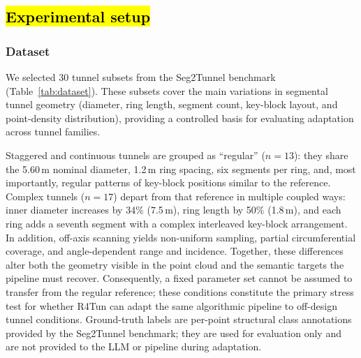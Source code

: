 \documentclass[a4paper,fleqn]{cas-dc}
\begin{document}
{\subsection{\hl{Experimental setup}}\label{sec:exp-setup}

\subsubsection{Dataset}\label{sec:dataset}

We selected 30 tunnel subsets from the Seg2Tunnel benchmark (Table~\ref{tab:dataset}). These subsets cover the main variations in segmental tunnel geometry (diameter, ring length, segment count, key-block layout, and point-density distribution), providing a controlled basis for evaluating adaptation across tunnel families.

Staggered and continuous tunnels are grouped as ``regular'' ($n = 13$): they share the 5.60\,m nominal diameter, 1.2\,m ring spacing, six segments per ring, and, most importantly, regular patterns of key-block positions similar to the reference. Complex tunnels ($n = 17$) depart from that reference in multiple coupled ways: inner diameter increases by 34\% (7.5\,m), ring length by 50\% (1.8\,m), and each ring adds a seventh segment with a complex interleaved key-block arrangement. In addition, off-axis scanning yields non-uniform sampling, partial circumferential coverage, and angle-dependent range and incidence. Together, these differences alter both the geometry visible in the point cloud and the semantic targets the pipeline must recover. Consequently, a fixed parameter set cannot be assumed to transfer from the regular reference; these conditions constitute the primary stress test for whether R4Tun can adapt the same algorithmic pipeline to off-design tunnel conditions. Ground-truth labels are per-point structural class annotations provided by the Seg2Tunnel benchmark; they are used for evaluation only and are not provided to the LLM or pipeline during adaptation.

}
\end{document}
